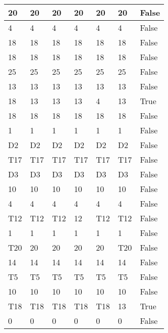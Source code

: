 \begin{longtable}[htbp]{| p{} | p{} | p{}| p{}| p{}| p{}| p{}|}
20 & 20 & 20 & 20 & 20 & 20 & False \\ \hline
4 & 4 & 4 & 4 & 4 & 4 & False \\ \hline
18 & 18 & 18 & 18 & 18 & 18 & False \\ \hline
18 & 18 & 18 & 18 & 18 & 18 & False \\ \hline
25 & 25 & 25 & 25 & 25 & 25 & False \\ \hline
13 & 13 & 13 & 13 & 13 & 13 & False \\ \hline
18 & 13 & 13 & 13 & 4 & 13 & True \\ \hline
18 & 18 & 18 & 18 & 18 & 18 & False \\ \hline
1 & 1 & 1 & 1 & 1 & 1 & False \\ \hline
\multicolumn{1}{|l|}{D2} & \multicolumn{1}{l|}{D2} & \multicolumn{1}{l|}{D2} & \multicolumn{1}{l|}{D2} & \multicolumn{1}{l|}{D2} & \multicolumn{1}{l|}{D2} & False \\ \hline
\multicolumn{1}{|l|}{T17} & \multicolumn{1}{l|}{T17} & \multicolumn{1}{l|}{T17} & \multicolumn{1}{l|}{T17} & \multicolumn{1}{l|}{T17} & \multicolumn{1}{l|}{T17} & False \\ \hline
\multicolumn{1}{|l|}{D3} & \multicolumn{1}{l|}{D3} & \multicolumn{1}{l|}{D3} & \multicolumn{1}{l|}{D3} & \multicolumn{1}{l|}{D3} & \multicolumn{1}{l|}{D3} & False \\ \hline
10 & 10 & 10 & 10 & 10 & 10 & False \\ \hline
4 & 4 & 4 & 4 & 4 & 4 & False \\ \hline
\multicolumn{1}{|l|}{T12} & \multicolumn{1}{l|}{T12} & \multicolumn{1}{l|}{T12} & 12 & \multicolumn{1}{l|}{T12} & \multicolumn{1}{l|}{T12} & False \\ \hline
1 & 1 & 1 & 1 & 1 & 1 & False \\ \hline
\multicolumn{1}{|l|}{T20} & 20 & 20 & 20 & 20 & \multicolumn{1}{l|}{T20} & False \\ \hline
14 & 14 & 14 & 14 & 14 & 14 & False \\ \hline
\multicolumn{1}{|l|}{T5} & \multicolumn{1}{l|}{T5} & \multicolumn{1}{l|}{T5} & \multicolumn{1}{l|}{T5} & \multicolumn{1}{l|}{T5} & \multicolumn{1}{l|}{T5} & False \\ \hline
10 & 10 & 10 & 10 & 10 & 10 & False \\ \hline
\multicolumn{1}{|l|}{T18} & \multicolumn{1}{l|}{T18} & \multicolumn{1}{l|}{T18} & \multicolumn{1}{l|}{T18} & \multicolumn{1}{l|}{T18} & 13 & True \\ \hline
0 & 0 & 0 & 0 & 0 & 0 & False \\ \hline

\end{longtable}
